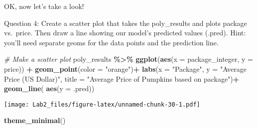 \documentclass[
]{article}
\newenvironment{Shaded}{\begin{snugshade}}{\end{snugshade}}
\newcommand{\AttributeTok}[1]{\textcolor[rgb]{0.13,0.29,0.53}{#1}}
\newcommand{\CommentTok}[1]{\textcolor[rgb]{0.56,0.35,0.01}{\textit{#1}}}
\newcommand{\FunctionTok}[1]{\textcolor[rgb]{0.13,0.29,0.53}{\textbf{#1}}}
\newcommand{\NormalTok}[1]{#1}
\newcommand{\SpecialCharTok}[1]{\textcolor[rgb]{0.81,0.36,0.00}{\textbf{#1}}}
\newcommand{\StringTok}[1]{\textcolor[rgb]{0.31,0.60,0.02}{#1}}
\begin{document}
OK, now let's take a look!

Question 4: Create a scatter plot that takes the poly\_results and plots
package vs.~price. Then draw a line showing our model's predicted values
(.pred). Hint: you'll need separate geoms for the data points and the
prediction line.

\begin{Shaded}
\begin{Highlighting}[]
\CommentTok{\# Make a scatter plot}
\NormalTok{poly\_results }\SpecialCharTok{\%\textgreater{}\%} \FunctionTok{ggplot}\NormalTok{(}\FunctionTok{aes}\NormalTok{(}\AttributeTok{x =}\NormalTok{ package\_integer, }\AttributeTok{y =}\NormalTok{ price)) }\SpecialCharTok{+}  
  \FunctionTok{geom\_point}\NormalTok{(}\AttributeTok{color =} \StringTok{"orange"}\NormalTok{)}\SpecialCharTok{+}
  \FunctionTok{labs}\NormalTok{(}\AttributeTok{x =} \StringTok{"Package"}\NormalTok{, }\AttributeTok{y =} \StringTok{"Average Price (US Dollar)"}\NormalTok{, }\AttributeTok{title =} \StringTok{"Average Price of Pumpkins based on package"}\NormalTok{)}\SpecialCharTok{+}
  \FunctionTok{geom\_line}\NormalTok{( }\FunctionTok{aes}\NormalTok{(}\AttributeTok{y =}\NormalTok{ .pred))}
\end{Highlighting}
\end{Shaded}

\texttt{[image: Lab2\_files/figure-latex/unnamed-chunk-30-1.pdf]}

\begin{Shaded}
\begin{Highlighting}[]
  \FunctionTok{theme\_minimal}\NormalTok{()}
\end{Highlighting}
\end{Shaded}
\end{document}
